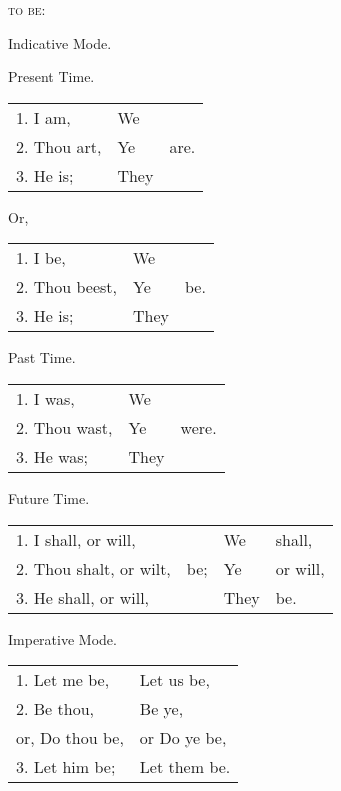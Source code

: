 
\begin{center}
  \textsc{to be}:

  Indicative Mode.

  Present Time.

  \begin{tabular}[h]{lll}
    1. I am, & We\\
    2. Thou art, & Ye & are.\\
    3. He is; & They\\
  \end{tabular}

  Or,

  \begin{tabular}[h]{lll}
    1. I be, & We\\
    2. Thou beest, & Ye & be.\\
    3. He is;\footnotemark & They\\
  \end{tabular}

  Past Time.

  \begin{tabular}[h]{lll}
    1. I was, & We\\
    2. Thou wast, & Ye & were.\\
    3. He was; & They\\
  \end{tabular}

  Future Time.

  \begin{tabular}[h]{llll}
    1. I shall, or will, & & We & shall,\\
    2. Thou shalt, or wilt, & be; & Ye & or will,\\
    3. He shall, or will, & & They & be.\\
  \end{tabular}

  Imperative Mode.

  \begin{tabular}[h]{ll}
    1. Let me be, & Let us be,\\
    2. Be thou, & Be ye,\\
    or, Do thou be, & or Do ye be,\\
    3. Let him be; & Let them be.\\
  \end{tabular}


\end{center}
